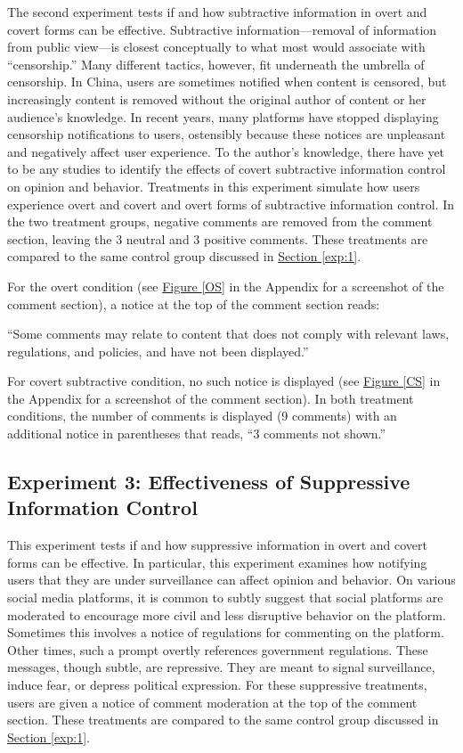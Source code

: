\documentclass[11pt]{article}
\begin{document}
The second experiment tests if and how subtractive information in overt and covert forms can be effective. Subtractive information---removal of information from public view---is closest conceptually to what most would associate with ``censorship.'' Many different tactics, however, fit underneath the umbrella of censorship. In China, users are sometimes notified when content is censored, but increasingly content is removed without the original author of content or her audience's knowledge. In recent years, many platforms have stopped displaying censorship notifications to users, ostensibly because these notices are unpleasant and negatively affect user experience. To the author's knowledge, there have yet to be any studies to identify the effects of covert subtractive information control on opinion and behavior. Treatments in this experiment simulate how users experience overt and covert and overt forms of subtractive information control. In the two treatment groups, negative comments are removed from the comment section, leaving the 3 neutral and 3 positive comments. These treatments are compared to the same control group discussed in \hyperref[exp:1]{Section \ref{exp:1}}.

For the overt condition (see \hyperref[OS]{Figure \ref*{OS}} in the Appendix for a screenshot of the comment section), a notice at the top of the comment section reads:

``Some comments may relate to content that does not comply with relevant laws, regulations, and policies, and have not been displayed.''

For covert subtractive condition, no such notice is displayed (see \hyperref[CS]{Figure \ref*{CS}} in the Appendix for a screenshot of the comment section). In both treatment conditions, the number of comments is displayed (9 comments) with an additional notice in parentheses that reads, ``3 comments not shown.''

\subsection{Experiment 3: Effectiveness of Suppressive Information Control}

This experiment tests if and how suppressive information in overt and covert forms can be effective. In particular, this experiment examines how notifying users that they are under surveillance can affect opinion and behavior. On various social media platforms, it is common to subtly suggest that social platforms are moderated to encourage more civil and less disruptive behavior on the platform. Sometimes this involves a notice of regulations for commenting on the platform. Other times, such a prompt overtly references government regulations. These messages, though subtle, are repressive. They are meant to signal surveillance, induce fear, or depress political expression. For these suppressive treatments, users are given a notice of comment moderation at the top of the comment section. These treatments are compared to the same control group discussed in \hyperref[exp:1]{Section \ref{exp:1}}.
\end{document}
